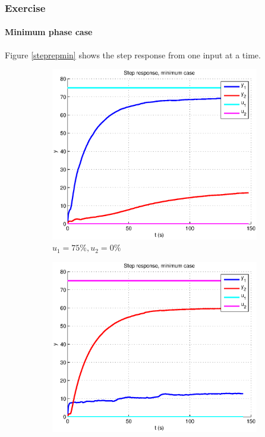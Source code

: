 \subsubsection{Exercise} 

\paragraph{Minimum phase case}

Figure \ref{steprepmin} shows the step response from one input at a time.

\begin{figure}[h!t]
        \centering
        \begin{subfigure}[b]{0.45\columnwidth}
                \includegraphics[width=\columnwidth]{fig/steprepmin75_0.eps}
                \caption{$u_1 = 75\%, u_2 = 0\%$}
        \end{subfigure}
        \begin{subfigure}[b]{0.45\columnwidth}
                \includegraphics[width=\columnwidth]{fig/steprepmin0_75.eps}

\end{subfigure}
\end{figure}

